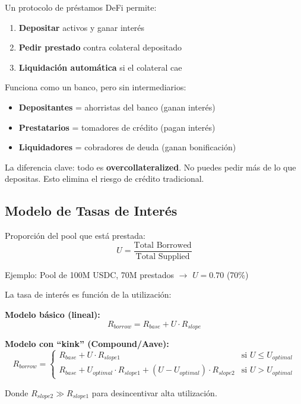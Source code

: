 \documentclass[11pt,a4paper,twoside]{book}
\begin{document}
\begin{definition}
Un protocolo de pr\'estamos DeFi permite:
\begin{enumerate}
    \item \textbf{Depositar} activos y ganar inter\'es
    \item \textbf{Pedir prestado} contra colateral depositado
    \item \textbf{Liquidaci\'on autom\'atica} si el colateral cae
\end{enumerate}
\end{definition}

\begin{intuicion}
Funciona como un banco, pero sin intermediarios:
\begin{itemize}
    \item \textbf{Depositantes} = ahorristas del banco (ganan inter\'es)
    \item \textbf{Prestatarios} = tomadores de cr\'edito (pagan inter\'es)
    \item \textbf{Liquidadores} = cobradores de deuda (ganan bonificaci\'on)
\end{itemize}

La diferencia clave: todo es \textbf{overcollateralized}. No puedes pedir m\'as de lo que depositas. Esto elimina el riesgo de cr\'edito tradicional.
\end{intuicion}

\subsection{Modelo de Tasas de Inter\'es}

\begin{definition}
Proporci\'on del pool que est\'a prestada:
\[
U = \frac{\text{Total Borrowed}}{\text{Total Supplied}}
\]

Ejemplo: Pool de 100M USDC, 70M prestados $\to$ $U = 0.70$ (70\%)
\end{definition}

\begin{definition}
La tasa de inter\'es es funci\'on de la utilizaci\'on:

\textbf{Modelo b\'asico (lineal):}
\[
R_{borrow} = R_{base} + U \cdot R_{slope}
\]

\textbf{Modelo con ``kink'' (Compound/Aave):}
\[
R_{borrow} = \begin{cases}
R_{base} + U \cdot R_{slope1} & \text{si } U \leq U_{optimal} \\
R_{base} + U_{optimal} \cdot R_{slope1} + (U - U_{optimal}) \cdot R_{slope2} & \text{si } U > U_{optimal}
\end{cases}
\]

Donde $R_{slope2} \gg R_{slope1}$ para desincentivar alta utilizaci\'on.
\end{definition}
\end{document}
